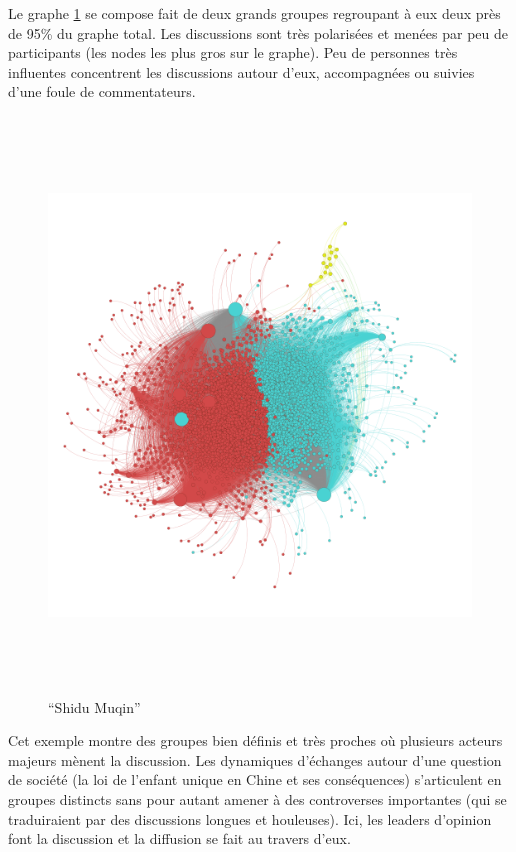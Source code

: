 \newpage

Le graphe \ref{fig:shidumuqin} se compose fait de deux grands groupes regroupant à eux deux près de 95\% du graphe total. Les discussions sont très polarisées et menées par peu de participants (les nodes les plus gros sur le graphe). Peu de personnes très influentes concentrent les discussions autour d{\textquoteright}eux, accompagnées ou suivies d{\textquoteright}une foule de commentateurs.  

\begin{figure}[h!]
    \centering
    \includegraphics[width=6.0114in,height=6.0114in]{figures/chap3/chapitre3-img18.png}
    \caption{{\textquotedblleft}Shidu Muqin{\textquotedblright}}
    \label{fig:shidumuqin}
\end{figure}


Cet exemple montre des groupes bien définis et très proches o\`u plusieurs acteurs majeurs mènent la discussion. Les dynamiques d{\textquoteright}échanges autour d{\textquoteright}une question de société (la loi de l{\textquoteright}enfant unique en Chine et ses conséquences) s{\textquoteright}articulent en groupes distincts sans pour autant amener à des controverses importantes (qui se traduiraient par des discussions longues et houleuses). Ici, les leaders d{\textquoteright}opinion font la discussion et la diffusion se fait au travers d{\textquoteright}eux.

